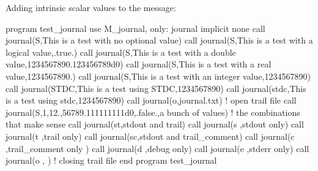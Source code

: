 Adding intrinsic scalar values to the message\+:

program test\+\_\+journal use M\+\_\+journal, only\+: journal implicit none call journal(\textquotesingle{}S\textquotesingle{},\textquotesingle{}This is a test with no optional value\textquotesingle{}) call journal(\textquotesingle{}S\textquotesingle{},\textquotesingle{}This is a test with a logical value\textquotesingle{},.true.) call journal(\textquotesingle{}S\textquotesingle{},\textquotesingle{}This is a test with a double value\textquotesingle{},1234567890.\+123456789d0) call journal(\textquotesingle{}S\textquotesingle{},\textquotesingle{}This is a test with a real value\textquotesingle{},1234567890.) call journal(\textquotesingle{}S\textquotesingle{},\textquotesingle{}This is a test with an integer value\textquotesingle{},1234567890) call journal(\textquotesingle{}S\+T\+DC\textquotesingle{},\textquotesingle{}This is a test using S\+T\+DC\textquotesingle{},1234567890) call journal(\textquotesingle{}stdc\textquotesingle{},\textquotesingle{}This is a test using stdc\textquotesingle{},1234567890) call journal(\textquotesingle{}o\textquotesingle{},\textquotesingle{}journal.\+txt\textquotesingle{}) ! open trail file call journal(\textquotesingle{}S\textquotesingle{},1,12.,56789.\+111111111d0,.false.,\textquotesingle{}a bunch of values\textquotesingle{}) ! the combinations that make sense call journal(\textquotesingle{}st\textquotesingle{},\textquotesingle{}stdout and trail\textquotesingle{}) call journal(\textquotesingle{}s\textquotesingle{} ,\textquotesingle{}stdout only\textquotesingle{}) call journal(\textquotesingle{}t\textquotesingle{} ,\textquotesingle{}trail only\textquotesingle{}) call journal(\textquotesingle{}sc\textquotesingle{},\textquotesingle{}stdout and trail\+\_\+comment\textquotesingle{}) call journal(\textquotesingle{}c\textquotesingle{} ,\textquotesingle{}trail\+\_\+comment only \textquotesingle{}) call journal(\textquotesingle{}d\textquotesingle{} ,\textquotesingle{}debug only\textquotesingle{}) call journal(\textquotesingle{}e\textquotesingle{} ,\textquotesingle{}stderr only\textquotesingle{}) call journal(\textquotesingle{}o\textquotesingle{} ,\textquotesingle{} \textquotesingle{}) ! closing trail file end program test\+\_\+journal

